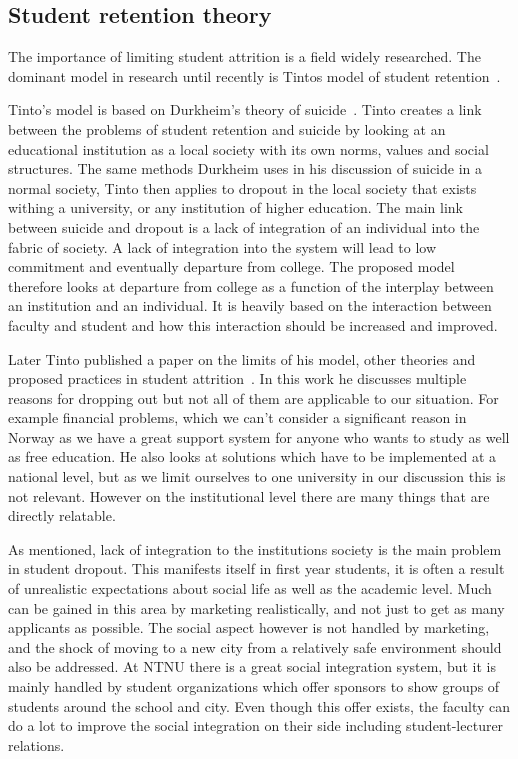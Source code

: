 \subsection{Student retention theory}
The importance of limiting student attrition is a field widely researched.
The dominant model in research until recently is Tintos model of student retention~\cite{1982}.

\bigskip\noindent
Tinto's model is based on Durkheim's theory of suicide~\cite{Tinto01031975}.
Tinto creates a link between the problems of student retention and suicide by looking at an educational institution as a local society with its own norms, values and social structures.
The same methods Durkheim uses in his discussion of suicide in a normal society, 
Tinto then applies to dropout in the local society that exists withing a university, 
or any institution of higher education.
The main link between suicide and dropout is a lack of integration of an individual into the fabric of society.
A lack of integration into the system will lead to low commitment and eventually departure from college.
The proposed model therefore looks at departure from college as a function of the interplay between an institution and an individual.
It is heavily based on the interaction between faculty and student and how this interaction should be increased and improved.

\bigskip\noindent
Later Tinto published a paper on the limits of his model, other theories and proposed practices in student attrition~\cite{1982}.
In this work he discusses multiple reasons for dropping out but not all of them are applicable to our situation. For example financial problems, which we can't consider a significant reason in Norway as we have a great support system for anyone who wants to study as well as free education.
He also looks at solutions which have to be implemented at a national level, but as we limit ourselves to one university in our discussion this is not relevant.
However on the institutional level there are many things that are directly relatable.

\bigskip\noindent
As mentioned, lack of integration to the institutions society is the main problem in student dropout.
This manifests itself in first year students, it is often a result of unrealistic expectations about social life as well as the academic level.
Much can be gained in this area by marketing realistically, and not just to get as many applicants as possible.
The social aspect however is not handled by marketing, and the shock of moving to a new city from a relatively safe environment should also be addressed.
At NTNU there is a great social integration system, but it is mainly handled by student organizations which offer sponsors to show groups of students around the school and city.
Even though this offer exists, the faculty can do a lot to improve the social integration on their side including student-lecturer relations.

